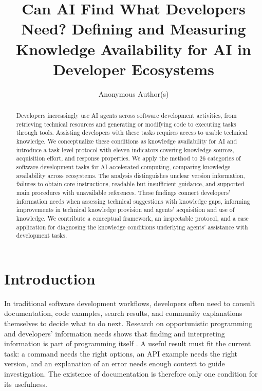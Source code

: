 \documentclass[manuscript,review,anonymous]{acmart}
\begin{document}
\title[Knowledge Availability for AI in Developer Ecosystems]{Can AI Find What Developers Need? Defining and Measuring Knowledge Availability for AI in Developer Ecosystems}
\author{Anonymous Author(s)}

\begin{abstract}
Developers increasingly use AI agents across software development activities, from retrieving technical resources and generating or modifying code to executing tasks through tools. Assisting developers with these tasks requires access to usable technical knowledge. We conceptualize these conditions as knowledge availability for AI and introduce a task-level protocol with eleven indicators covering knowledge sources, acquisition effort, and response properties. We apply the method to 26 categories of software development tasks for AI-accelerated computing, comparing knowledge availability across ecosystems. The analysis distinguishes unclear version information, failures to obtain core instructions, readable but insufficient guidance, and supported main procedures with unavailable references. These findings connect developers' information needs when assessing technical suggestions with knowledge gaps, informing improvements in technical knowledge provision and agents' acquisition and use of knowledge. We contribute a conceptual framework, an inspectable protocol, and a case application for diagnosing the knowledge conditions underlying agents' assistance with development tasks.
\end{abstract}
\maketitle

\section{Introduction}\label{introduction}

In traditional software development workflows, developers often need to consult documentation, code examples, search results, and community explanations themselves to decide what to do next. Research on opportunistic programming and developers' information needs shows that finding and interpreting information is part of programming itself \citep{brand2009, ko2007, sillito2008}. A useful result must fit the current task: a command needs the right options, an API example needs the right version, and an explanation of an error needs enough context to guide investigation. The existence of documentation is therefore only one condition for its usefulness.
\end{document}

